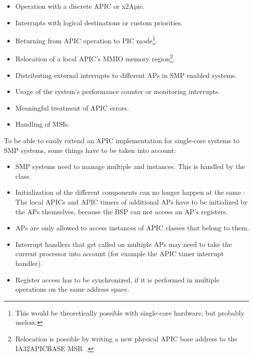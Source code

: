 \begin{itemize}
  \item Operation with a discrete APIC or x2Apic.
  \item Interrupts with logical destinations or custom priorities.
  \item Returning from APIC operation to PIC mode\footnote{
        This would be theoretically possible with single-core hardware, but probably useless.}.
  \item Relocation of a local APIC's MMIO memory region\footnote{
        Relocation is possible by writing a new physical APIC base address to the IA32\textunderscore{}APIC\textunderscore{}BASE MSR~\autocite[sec.~3.11.4.5]{ia32}.}.
  \item Distributing external interrupts to different APs in SMP enabled systems.
  \item Usage of the system's performance counter or monitoring interrupts.
  \item Meaningful treatment of APIC errors.
  \item Handling of MSIs.
\end{itemize}

To be able to easily extend an APIC implementation for single-core systems to SMP systems, some things have to be taken into account:

\begin{itemize}
  \item SMP systems need to manage multiple  and  instances.
        This is handled by the  class.
  \item Initialization of the different components can no longer happen at the same : The local APICs and APIC timers of additional APs have to be initialized by the APs themselves, because the BSP can not access an AP's registers.
  \item APs are only allowed to access instances of APIC classes that belong to them.
  \item Interrupt handlers that get called on multiple APs may need to take the current processor into account (for example the APIC timer interrupt handler).
  \item Register access has to be synchronized, if it is performed in multiple operations on the same address space.
\end{itemize}

